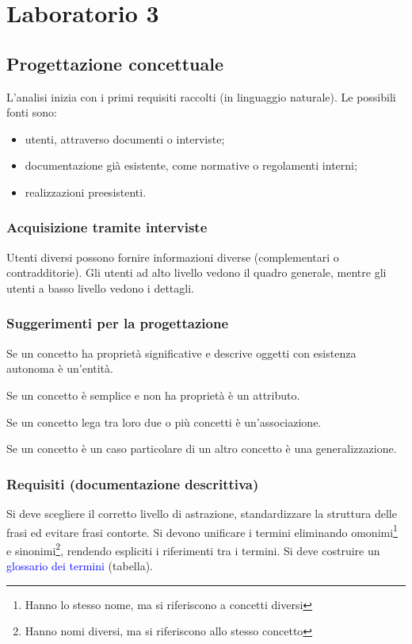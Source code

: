 \chapter{Laboratorio 3}

\section{Progettazione concettuale}

L'analisi inizia con i primi requisiti raccolti (in linguaggio naturale).
Le possibili fonti sono:
\begin{itemize}
    \item utenti, attraverso documenti o interviste;
    \item documentazione già esistente, come normative o regolamenti interni;
    \item realizzazioni preesistenti.
\end{itemize}

\subsection{Acquisizione tramite interviste}
Utenti diversi possono fornire informazioni diverse (complementari o contradditorie). Gli utenti ad alto livello vedono il quadro generale, mentre gli utenti a basso livello vedono i dettagli.

\subsection{Suggerimenti per la progettazione}

Se un concetto ha proprietà significative e descrive oggetti con esistenza autonoma è un'entità.

Se un concetto è semplice e non ha proprietà è un attributo.

Se un concetto lega tra loro due o più concetti è un'associazione.

Se un concetto è un caso particolare di un altro concetto è una generalizzazione.

\subsection{Requisiti (documentazione descrittiva)}

Si deve scegliere il corretto livello di astrazione, standardizzare la struttura delle frasi ed evitare frasi contorte. Si devono unificare i termini eliminando omonimi\footnote{Hanno lo stesso nome, ma si riferiscono a concetti diversi} e sinonimi\footnote{Hanno nomi diversi, ma si riferiscono allo stesso concetto}, rendendo espliciti i riferimenti tra i termini. Si deve costruire un \textcolor{blue}{glossario dei termini} (tabella).

